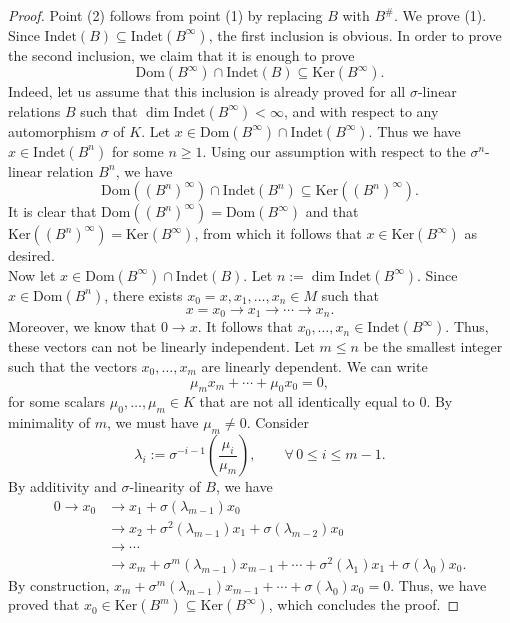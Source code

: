 \documentclass[12pt]{amsart}
\theoremstyle{definition}
\newcommand{\<}{\langle}   %
\renewcommand{\>}{\rangle} %
\begin{document}
\begin{proof}
Point (2) follows from point (1) by replacing $B$ with $B^{\#}$. We prove (1). Since $\mathrm{Indet}(B) \subseteq \mathrm{Indet}(B^{\infty})$, the first inclusion is obvious. In order to prove the second inclusion, we claim that it is enough to prove 
\begin{equation*}
    \mathrm{Dom}(B^{\infty}) \cap \mathrm{Indet}(B) \subseteq  \mathrm{Ker}(B^{\infty}).
\end{equation*}
Indeed, let us assume that this inclusion is already proved for all $\sigma$-linear relations $B$ such that $\dim\mathrm{Indet}(B^{\infty}) < \infty$, and with respect to any automorphism $\sigma$ of $K$. Let $x \in \mathrm{Dom}(B^{\infty})\cap \mathrm{Indet}(B^{\infty})$. Thus we have $x \in \mathrm{Indet}(B^n)$ for some $n\geq 1$. Using our assumption with respect to the $\sigma^n$-linear relation $B^n$, we have 
\begin{equation*}
    \mathrm{Dom}((B^n)^{\infty}) \cap \mathrm{Indet}(B^n) \subseteq  \mathrm{Ker}((B^n)^{\infty}).
\end{equation*}
It is clear that $\mathrm{Dom}((B^n)^{\infty}) = \mathrm{Dom}(B^{\infty})$ and that $\mathrm{Ker}((B^n)^{\infty}) = \mathrm{Ker}(B^{\infty})$, from which it follows that $x \in \mathrm{Ker}(B^{\infty})$ as desired.\\
Now let $x \in \mathrm{Dom}(B^{\infty}) \cap \mathrm{Indet}(B)$. Let $n := \dim \mathrm{Indet}(B^{\infty})$. Since $x \in \mathrm{Dom}(B^n)$, there exists $x_0 = x, x_1, \ldots, x_{n} \in M$ such that 
\begin{equation*}
    x = x_0 \to x_1 \to \cdots \to x_{n}.
\end{equation*} 
Moreover, we know that $0 \to x$. It follows that $x_0,\ldots ,x_{n} \in \mathrm{Indet}(B^{\infty})$. Thus, these vectors can not be linearly independent. Let $m \leq n$ be the smallest integer such that the vectors $x_0,\ldots ,x_m$ are linearly dependent. We can write 
\begin{equation*}
    \mu_mx_m + \cdots + \mu_0x_0 = 0,
\end{equation*}
for some scalars $\mu_0,\ldots ,\mu_m \in K$ that are not all identically equal to $0$. By minimality of $m$, we must have $\mu_m \not = 0$. Consider 
\begin{equation*}
\lambda_i := \sigma^{-i-1}\left(\frac{\mu_i}{\mu_m}\right), \qquad \forall\, 0 \leq i \leq m-1.
\end{equation*}
By additivity and $\sigma$-linearity of $B$, we have 
\begin{align*}
    0 \to x_0 & \to x_1 + \sigma(\lambda_{m-1}) x_0\\
    & \to x_2 + \sigma^2(\lambda_{m-1})x_1 + \sigma(\lambda_{m-2})x_0 \\
    & \to \cdots \\
    & \to x_{m} + \sigma^{m}(\lambda_{m-1})x_{m-1} + \cdots + \sigma^2(\lambda_1)x_1 + \sigma(\lambda_0)x_0.
\end{align*}
By construction, $x_{m} + \sigma^{m}(\lambda_{m-1})x_{m-1} + \cdots + \sigma(\lambda_0)x_0 = 0$. Thus, we have proved that $x_0 \in \mathrm{Ker}(B^{m}) \subseteq  \mathrm{Ker}(B^{\infty})$, which concludes the proof.
\end{proof}
\end{document}
